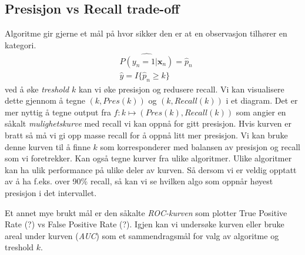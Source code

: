 \subsection{Presisjon vs Recall trade-off}
Algoritme gir gjerne et mål på hvor sikker den er at en observasjon tilhører en kategori.
\begin{align}
&\widehat{P(y_n=1|\mathbf{x}_n)} = \hat{p}_n \\
&\hat{y}=I\{\hat{p}_n \geq k\}
\end{align}
ved å øke \textit{treshold} $k$ kan vi øke presisjon og redusere recall. Vi kan visualisere dette gjennom å tegne $(k, Pres(k))$ og $(k, Recall(k))$ i et diagram. Det er mer nyttig å tegne output fra $f:k\mapsto (Pres(k),Recall(k))$ som angier en såkalt \textit{mulighetskurve} med recall vi kan oppnå for gitt presisjon. Hvis kurven er bratt så må vi gi opp masse recall for å oppnå litt mer presisjon. Vi kan bruke denne kurven til å finne $k$ som korresponderer med balansen av presisjon og recall som vi foretrekker. Kan også tegne kurver fra ulike algoritmer. Ulike algoritmer kan ha ulik performance på ulike deler av kurven. Så dersom vi er veldig opptatt av å ha f.eks. over 90\% recall, så kan vi se hvilken algo som oppnår høyest presisjon i det intervallet.

Et annet mye brukt mål er den såkalte \textit{ROC-kurven} som plotter True Positive Rate (?) vs False Positive Rate (?). Igjen kan vi undersøke kurven eller bruke areal under kurven (\textit{AUC}) som et sammendragsmål for valg av algoritme og treshold $k$.